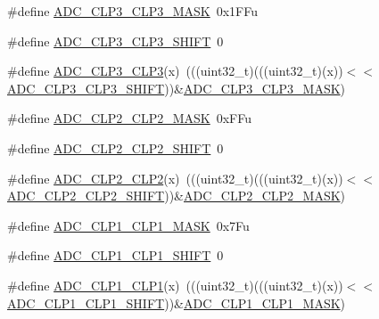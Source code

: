 \begin{DoxyCompactItemize}
\item 
\#define \hyperlink{group___a_d_c___register___masks_gaeae73e0daf3e9a9174024850a719768d}{A\+D\+C\+\_\+\+C\+L\+P3\+\_\+\+C\+L\+P3\+\_\+\+M\+A\+SK}~0x1\+F\+Fu
\item 
\#define \hyperlink{group___a_d_c___register___masks_ga9eef257b72d4181481aa5e3bf0a85732}{A\+D\+C\+\_\+\+C\+L\+P3\+\_\+\+C\+L\+P3\+\_\+\+S\+H\+I\+FT}~0
\item 
\#define \hyperlink{group___a_d_c___register___masks_ga3f0884b7fa6046cdcb1cce1eb2511baf}{A\+D\+C\+\_\+\+C\+L\+P3\+\_\+\+C\+L\+P3}(x)~(((uint32\+\_\+t)(((uint32\+\_\+t)(x))$<$$<$\hyperlink{group___a_d_c___register___masks_ga9eef257b72d4181481aa5e3bf0a85732}{A\+D\+C\+\_\+\+C\+L\+P3\+\_\+\+C\+L\+P3\+\_\+\+S\+H\+I\+FT}))\&\hyperlink{group___a_d_c___register___masks_gaeae73e0daf3e9a9174024850a719768d}{A\+D\+C\+\_\+\+C\+L\+P3\+\_\+\+C\+L\+P3\+\_\+\+M\+A\+SK})
\item 
\#define \hyperlink{group___a_d_c___register___masks_ga2d10a369ac0c13f4ee3535e9f45a5d17}{A\+D\+C\+\_\+\+C\+L\+P2\+\_\+\+C\+L\+P2\+\_\+\+M\+A\+SK}~0x\+F\+Fu
\item 
\#define \hyperlink{group___a_d_c___register___masks_ga071963a7a6ff4f1b72c79c66aee09043}{A\+D\+C\+\_\+\+C\+L\+P2\+\_\+\+C\+L\+P2\+\_\+\+S\+H\+I\+FT}~0
\item 
\#define \hyperlink{group___a_d_c___register___masks_ga9b88c4499b2da56a5919cb15dcdc5dab}{A\+D\+C\+\_\+\+C\+L\+P2\+\_\+\+C\+L\+P2}(x)~(((uint32\+\_\+t)(((uint32\+\_\+t)(x))$<$$<$\hyperlink{group___a_d_c___register___masks_ga071963a7a6ff4f1b72c79c66aee09043}{A\+D\+C\+\_\+\+C\+L\+P2\+\_\+\+C\+L\+P2\+\_\+\+S\+H\+I\+FT}))\&\hyperlink{group___a_d_c___register___masks_ga2d10a369ac0c13f4ee3535e9f45a5d17}{A\+D\+C\+\_\+\+C\+L\+P2\+\_\+\+C\+L\+P2\+\_\+\+M\+A\+SK})
\item 
\#define \hyperlink{group___a_d_c___register___masks_ga597fddbb6d859ea54a49dd4a1eea72fb}{A\+D\+C\+\_\+\+C\+L\+P1\+\_\+\+C\+L\+P1\+\_\+\+M\+A\+SK}~0x7\+Fu
\item 
\#define \hyperlink{group___a_d_c___register___masks_gab34e145666bb569d17f381665d6f5156}{A\+D\+C\+\_\+\+C\+L\+P1\+\_\+\+C\+L\+P1\+\_\+\+S\+H\+I\+FT}~0
\item 
\#define \hyperlink{group___a_d_c___register___masks_gaf48a7a2edeb5d0485c5cdfdf19bd3e18}{A\+D\+C\+\_\+\+C\+L\+P1\+\_\+\+C\+L\+P1}(x)~(((uint32\+\_\+t)(((uint32\+\_\+t)(x))$<$$<$\hyperlink{group___a_d_c___register___masks_gab34e145666bb569d17f381665d6f5156}{A\+D\+C\+\_\+\+C\+L\+P1\+\_\+\+C\+L\+P1\+\_\+\+S\+H\+I\+FT}))\&\hyperlink{group___a_d_c___register___masks_ga597fddbb6d859ea54a49dd4a1eea72fb}{A\+D\+C\+\_\+\+C\+L\+P1\+\_\+\+C\+L\+P1\+\_\+\+M\+A\+SK})
$$
\end{DoxyCompactItemize}
